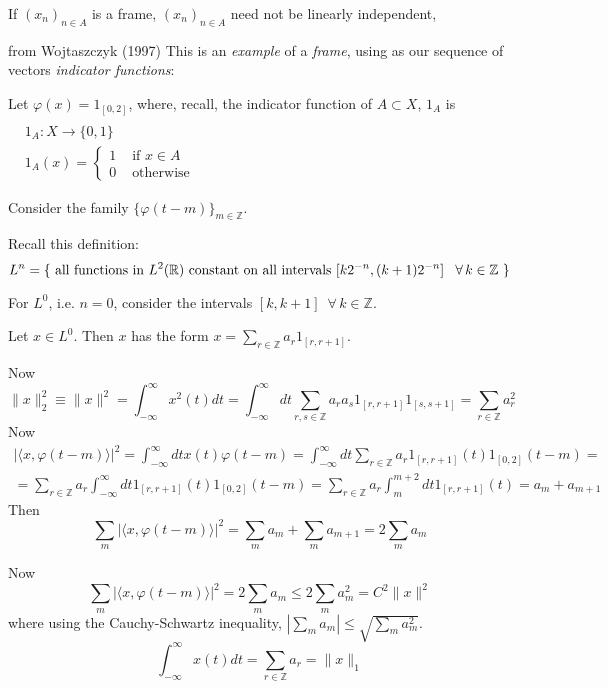 \documentclass[twoside]{amsart}
\theoremstyle{plain}
\theoremstyle{definition}
\theoremstyle{remark}
\numberwithin{equation}{section}
\newcommand{\exercisehead}[1]
  { \smallskip
   \noindent{\small\bf Exercise #1.}
  }
\begin{document}
If $(x_n)_{n\in A}$ is a frame, $(x_n)_{n\in A}$ need not be linearly independent, 


\exercisehead{2.15} from Wojtaszczyk (1997) \cite{PWojtaszczyk1997} This is an \emph{example} of a \emph{frame}, using as our sequence of vectors \emph{indicator functions}:

Let $\varphi(x) = 1_{[0,2]}$, where, recall, the indicator function of $A \subset X$, $1_A$ is $\begin{aligned} & \quad \\
  & 1_A : X \to \lbrace 0 ,1 \rbrace \\
  & 1_A(x) = \begin{cases} 1 & \text{ if } x \in A \\
    0 & \text{ otherwise } \end{cases} \end{aligned}$

Consider the family $\lbrace \varphi(t-m) \rbrace_{m\in \mathbb{Z}}$.  

Recall this definition:
\[
L^n = \lbrace \text{ all functions in $L^2(\mathbb{R})$ constant on all intervals $[k2^{-n}, (k+1)2^{-n}]$ \, $ \forall \, k \in \mathbb{Z}$ } \rbrace
\]

For $L^0$, i.e. $n=0$, consider the intervals $[k,k+1]$\, $\forall \, k \in \mathbb{Z}$.  

Let $x\in L^0$.  Then $x$ has the form $x = \sum_{r\in \mathbb{Z}} a_r 1_{[r,r+1]}$.  

Now
\[
\| x\|^2_2 \equiv \| x\|^2 = \int_{-\infty}^{\infty} x^2(t) dt = \int_{-\infty}^{\infty} dt \sum_{r,s\in \mathbb{Z}} a_r a_s 1_{[r,r+1]} 1_{[s,s+1]} = \sum_{r\in \mathbb{Z}} a_r^2
\]
Now
\[
\begin{gathered}
  | \langle x, \varphi(t-m) \rangle |^2 = \int_{-\infty}^{\infty} dt x(t) \varphi(t-m) = \int_{-\infty}^{\infty} dt \sum_{r\in \mathbb{Z}} a_r 1_{[r,r+1]}(t) 1_{[0,2]}(t-m) = \\
  = \sum_{r\in \mathbb{Z}}a_r \int_{-\infty}^{\infty} dt 1_{[r,r+1]}(t) 1_{[0,2]}(t-m) = \sum_{r\in \mathbb{Z}} a_r \int_m^{m+2} dt 1_{[r,r+1]}(t) = a_m + a_{m+1}
\end{gathered}
\]
Then
\[
\sum_m | \langle x, \varphi(t-m) \rangle |^2 = \sum_m a_m + \sum_m a_{m+1} = 2 \sum_m a_m
\]

Now
\[
\sum_m | \langle x , \varphi(t-m) \rangle |^2 = 2 \sum_m a_m \leq 2 \sum_m a_m^2 = C^2 \| x \|^2
\]
where using the Cauchy-Schwartz inequality, $| \sum_m a_m | \leq \sqrt{ \sum_m a_m^2 }$.  
\[
\int_{-\infty}^{\infty}x(t) dt = \sum_{r\in \mathbb{Z}} a_r = \| x \|_1
\]
\end{document}
